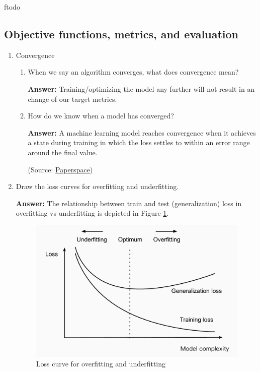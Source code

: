 ƒtodo\documentclass{article}
\newenvironment{QandA}{\begin{enumerate}[label=\arabic*.]}{\end{enumerate}}
\newenvironment{InnerQandA}{\begin{enumerate}[label=\roman*.]}{\end{enumerate}}
\newenvironment{answer}{\par\normalfont \textbf{Answer:}}{}
\begin{document}
\subsection{Objective functions, metrics, and evaluation}
\begin{QandA}
    \item Convergence
    \begin{InnerQandA}
        \item When we say an algorithm converges, what does convergence mean?
        \begin{answer}
            Training/optimizing the model any further will not result in an change of our target metrics.
        \end{answer}

        \item How do we know when a model has converged?
        \begin{answer}
            A machine learning model reaches convergence when it achieves a state during training in which the loss settles to within an error range around the final value.

            (Source: \href{https://machine-learning.paperspace.com/wiki/convergence}{Paperspace})
        \end{answer}
    \end{InnerQandA}

    \item Draw the loss curves for overfitting and underfitting.
    \begin{answer}
        The relationship between train and test (generalization) loss in overfitting vs underfitting is depicted in Figure \ref{fig:overfitting_underfitting}.
    
        \begin{figure}[htb!]
            \centering
            \includegraphics[width=0.7\columnwidth]{img/overfitting-vs-underfitting.png}
            \caption{Loss curve for overfitting and underfitting \footnotemark }
            \label{fig:overfitting_underfitting}
        \end{figure}
    \end{answer}


\end{QandA}
\end{document}
